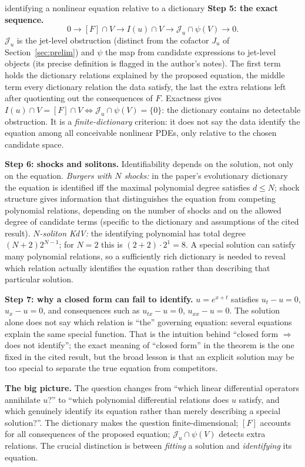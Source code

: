 \begin{explained}{identifying a nonlinear equation relative to a dictionary}
\medskip\textbf{Step 5: the exact sequence.}
\[
0\to[F]\cap V\to I(u)\cap V\to\mathcal J_u\cap\psi(V)\to0 .
\]
$\mathcal J_u$ is the jet-level obstruction (distinct from the cofactor $J_u$ of Section~\ref{sec:prelim}) and $\psi$ the map from candidate expressions to jet-level objects (its precise definition is flagged in the author's notes). The first term holds the dictionary relations explained by the proposed equation, the middle term every dictionary relation the data satisfy, the last the extra relations left after quotienting out the consequences of $F$. Exactness gives $I(u)\cap V=[F]\cap V\iff\mathcal J_u\cap\psi(V)=\{0\}$: the dictionary contains no detectable obstruction. It is a \emph{finite-dictionary} criterion: it does not say the data identify the equation among all conceivable nonlinear PDEs, only relative to the chosen candidate space.

\medskip\textbf{Step 6: shocks and solitons.} Identifiability depends on the solution, not only on the equation. \emph{Burgers with $N$ shocks:} in the paper's evolutionary dictionary the equation is identified iff the maximal polynomial degree satisfies $d\le N$; shock structure gives information that distinguishes the equation from competing polynomial relations, depending on the number of shocks and on the allowed degree of candidate terms (specific to the dictionary and assumptions of the cited result). \emph{$N$-soliton KdV:} the identifying polynomial has total degree $(N+2)2^{N-1}$; for $N=2$ this is $(2+2)\cdot2^{1}=8$. A special solution can satisfy many polynomial relations, so a sufficiently rich dictionary is needed to reveal which relation actually identifies the equation rather than describing that particular solution.

\medskip\textbf{Step 7: why a closed form can fail to identify.} $u=e^{x+t}$ satisfies $u_t-u=0$, $u_x-u=0$, and consequences such as $u_{tx}-u=0$, $u_{xx}-u=0$. The solution alone does not say which relation is ``the'' governing equation: several equations explain the same special function. That is the intuition behind ``closed form $\Rightarrow$ does not identify''; the exact meaning of ``closed form'' in the theorem is the one fixed in the cited result, but the broad lesson is that an explicit solution may be too special to separate the true equation from competitors.

\medskip\textbf{The big picture.} The question changes from ``which linear differential operators annihilate $u$?'' to ``which polynomial differential relations does $u$ satisfy, and which genuinely identify its equation rather than merely describing a special solution?''. The dictionary makes the question finite-dimensional; $[F]$ accounts for all consequences of the proposed equation; $\mathcal J_u\cap\psi(V)$ detects extra relations. The crucial distinction is between \emph{fitting} a solution and \emph{identifying} its equation.
\end{explained}

